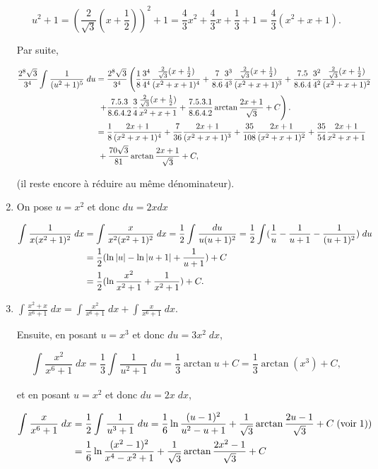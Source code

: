 \documentclass[11pt,a4paper]{article}
\newcommand{\Arctan}{\mathop{\mathrm{arctan}}\nolimits}
\begin{document}
\begin{enumerate}
$$u^2+1=(\frac{2}{\sqrt{3}}(x+\frac{1}{2}))^2+1=\frac{4}{3}x^2+\frac{4}{3}x+\frac{1}{3}+1=\frac{4}{3}(x^2+x+1).$$

Par suite,

\begin{align*}\ensuremath
\frac{2^8\sqrt{3}}{3^4}\int_{}^{}\frac{1}{(u^2+1)^5}\;du&=\frac{2^8\sqrt{3}}{3^4}
\left(
\frac{1}{8}\frac{3^4}{4^4}\frac{\frac{2}{\sqrt{3}}(x+\frac{1}{2})}{(x^2+x+1)^4}
+\frac{7}{8.6}\frac{3^3}{4^3}\frac{\frac{2}{\sqrt{3}}(x+\frac{1}{2})}{(x^2+x+1)^3}
+\frac{7.5}{8.6.4}\frac{3^2}{4^2}\frac{\frac{2}{\sqrt{3}}(x+\frac{1}{2})}{(x^2+x+1)^2}
\right.
\\
 &\;\left.+\frac{7.5.3}{8.6.4.2}\frac{3}{4}\frac{\frac{2}{\sqrt{3}}(x+\frac{1}{2})}{x^2+x+1}
 +\frac{7.5.3.1}{8.6.4.2}\Arctan\frac{2x+1}{\sqrt{3}}+C
 \right).\\
 &=\frac{1}{8}\frac{2x+1}{(x^2+x+1)^4}+\frac{7}{36}\frac{2x+1}{(x^2+x+1)^3}+\frac{35}{108}\frac{2x+1}{(x^2+x+1)^2}+\frac{35}{54}\frac{2x+1}{x^2+x+1}\\
 &\;+\frac{70\sqrt{3}}{81}\Arctan\frac{2x+1}{\sqrt{3}}+C,
\end{align*}

(il reste encore à réduire au même dénominateur).

\item  On pose $u=x^2$ et donc $du=2xdx$

\begin{align*}\ensuremath
\int_{}^{}\frac{1}{x(x^2+1)^2}\;dx&=\int_{}^{}\frac{x}{x^2(x^2+1)^2}\;dx=\frac{1}{2}\int_{}^{}\frac{du}{u(u+1)^2}
=\frac{1}{2}\int_{}^{}(\frac{1}{u}-\frac{1}{u+1}-\frac{1}{(u+1)^2})\;du\\
 &=\frac{1}{2}(\ln|u|-\ln|u+1|+\frac{1}{u+1})+C\\
 &=\frac{1}{2}(\ln\frac{x^2}{x^2+1}+\frac{1}{x^2+1})+C.
\end{align*}
\item  $\int_{}^{}\frac{x^2+x}{x^6+1}\;dx=\int_{}^{}\frac{x^2}{x^6+1}\;dx+\int_{}^{}\frac{x}{x^6+1}\;dx$.

Ensuite, en posant $u=x^3$ et donc $du=3x^2\;dx$,

$$\int_{}^{}\frac{x^2}{x^6+1}\;dx=\frac{1}{3}\int_{}^{}\frac{1}{u^2+1}\;du=\frac{1}{3}\Arctan u+C=\frac{1}{3}\Arctan(x^3)+C,$$

et en posant $u=x^2$ et donc $du=2x\;dx$,

\begin{align*}\ensuremath
\int_{}^{}\frac{x}{x^6+1}\;dx&=\frac{1}{2}\int_{}^{}\frac{1}{u^3+1}\;du
=\frac{1}{6}\ln\frac{(u-1)^2}{u^2-u+1}+\frac{1}{\sqrt{3}}\Arctan\frac{2u-1}{\sqrt{3}}+C\;(\mbox{voir}\;1))\\
 &=\frac{1}{6}\ln\frac{(x^2-1)^2}{x^4-x^2+1}+\frac{1}{\sqrt{3}}\Arctan\frac{2x^2-1}{\sqrt{3}}+C
\end{align*}


\end{enumerate}
\end{document}
